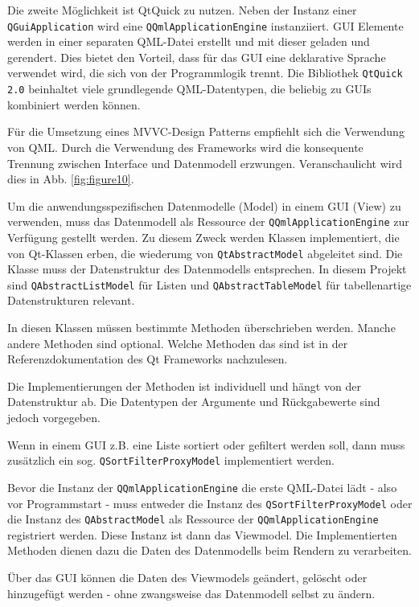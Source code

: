 Die zweite Möglichkeit ist QtQuick \cite{pysideQtQuick} zu nutzen. 
Neben der Instanz einer \verb|QGuiApplication| wird eine \verb|QQmlApplicationEngine| instanziiert.
GUI Elemente werden in einer separaten QML-Datei erstellt und mit dieser geladen und gerendert. 
Dies bietet den Vorteil, dass für das GUI eine deklarative Sprache verwendet wird, die sich von der Programmlogik trennt.
Die Bibliothek \verb|QtQuick 2.0| beinhaltet viele grundlegende QML-Datentypen, die beliebig zu GUIs kombiniert werden können.

Für die Umsetzung eines MVVC-Design Patterns empfiehlt sich die Verwendung von QML.
Durch die Verwendung des Frameworks wird die konsequente Trennung zwischen Interface und Datenmodell erzwungen.
Veranschaulicht wird dies in Abb. \ref{fig:figure10}.


Um die anwendungsspezifischen Datenmodelle (Model) in einem GUI (View) zu verwenden, muss das Datenmodell als Ressource
der \verb|QQmlApplicationEngine| zur Verfügung gestellt werden.
Zu diesem Zweck werden Klassen implementiert, die von Qt-Klassen erben, die wiederumg von \verb|QtAbstractModel| abgeleitet sind.
Die Klasse muss der Datenstruktur des Datenmodells entsprechen. In diesem Projekt sind \verb|QAbstractListModel| für Listen
und \verb|QAbstractTableModel| für tabellenartige Datenstrukturen relevant.

In diesen Klassen müssen bestimmte Methoden überschrieben werden. Manche andere Methoden sind optional. 
Welche Methoden das sind ist in der Referenzdokumentation des Qt Frameworks nachzulesen.

Die Implementierungen der Methoden ist individuell und hängt von der Datenstruktur ab. Die Datentypen der Argumente und Rückgabewerte sind 
jedoch vorgegeben.

Wenn in einem GUI z.B. eine Liste sortiert oder gefiltert werden soll, dann muss zusätzlich ein sog. \verb|QSortFilterProxyModel|
implementiert werden. 

Bevor die Instanz der \verb|QQmlApplicationEngine| die erste QML-Datei lädt - also vor Programmstart - muss entweder die Instanz des
\verb|QSortFilterProxyModel| oder die Instanz des \verb|QAbstractModel| als Ressource der \verb|QQmlApplicationEngine| registriert werden.
Diese Instanz ist dann das Viewmodel. Die Implementierten Methoden dienen dazu die Daten des Datenmodells beim Rendern zu verarbeiten. 

Über das GUI können die Daten des Viewmodels geändert, gelöscht oder hinzugefügt werden - ohne zwangsweise das Datenmodell selbst zu ändern.

